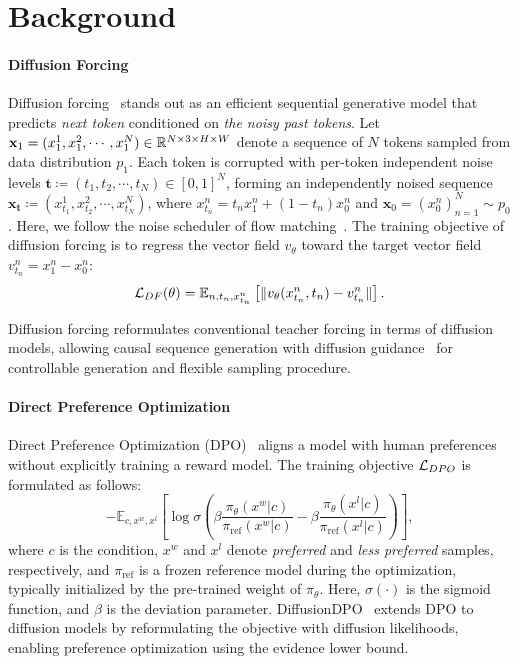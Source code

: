 \section{Background} \label{sec:background}
\paragraph{Diffusion Forcing} Diffusion forcing~\citep{diffusion_forcing} stands out as an efficient sequential generative model that predicts \textit{next token} conditioned on \textit{the noisy past tokens}. Let $\mathbf{x}_1 = (x_1^{1}, x_1^2, \cdots, x_1^{N}) \in \mathbb{R}^{N \times 3 \times H \times W}$ denote a sequence of $N$ tokens sampled from data distribution $p_1$. Each token is corrupted with per-token independent noise levels $\boldsymbol{t}\coloneqq (t_1, t_2, \cdots, t_N) \in [0, 1]^{N}$, forming an independently noised sequence $\mathbf{x}_{\mathbf{t}} \coloneqq (x^1_{t_1}, x^2_{t_2}, \cdots, x^N_{t_N})$,
where $x^{n}_{t_n} = t_n x_1^{n} + (1-t_n)x_0^n$ and $\mathbf{x}_0 = (x_0^{n})_{n=1}^{N}\sim p_0$. Here, we follow the noise scheduler of flow matching~\citep{cfm}. The training objective of diffusion forcing is to regress the vector field $v_\theta$ toward the target vector field $v^n_{t_n} = x^n_1-x^n_0$:
\begin{equation}
	\mathcal{L}_{DF}(\theta)  = \mathbb{E}_{n, t_n, x^n_{t_n}} \left[ \| v_{\theta}(x^n_{t_n}, t_n) -  v^n_{t_n}\| \right]. \label{eq:train_df}
\end{equation}

Diffusion forcing reformulates conventional teacher forcing in terms of diffusion models, allowing causal sequence generation with diffusion guidance~\citep{classifier_free} for controllable generation and flexible sampling procedure.

\paragraph{Direct Preference Optimization} Direct Preference Optimization (DPO)~\citep{rafailov2023dpo} aligns a model with human preferences without explicitly training a reward model. The training objective $\mathcal{L}_{DPO}$ is formulated as follows:
\begin{equation}
    - \mathbb{E}_{c, x^w, x^l} \left[ \log \sigma \left( \beta \frac{\pi_{\theta} (x^w | c) }{\pi_{\text{ref}}(x^w | c)}  - \beta \frac{\pi_{\theta}(x^l | c)}{\pi_{\text{ref}}(x^l | c) } \right)\right], \label{eq:dpo}
\end{equation}
where $c$ is the condition, $x^w$ and $x^l$ denote \textit{preferred} and \textit{less preferred} samples, respectively, and $\pi_{\text{ref}}$ is a frozen reference model during the optimization, typically initialized by the pre-trained weight of $\pi_\theta$. Here, $\sigma(\cdot)$ is the sigmoid function, and $\beta$ is the deviation parameter. 
DiffusionDPO~\citep{wallace2024diffusiondpo} extends DPO to diffusion models by reformulating the objective with diffusion likelihoods, enabling preference optimization using the evidence lower bound.
